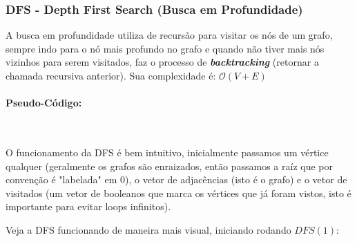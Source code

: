 \subsubsection{DFS - Depth First Search (Busca em Profundidade)}
A busca em profundidade utiliza de recursão para visitar os nós de um grafo,
sempre indo para o nó mais profundo no grafo e quando não tiver mais nós
vizinhos para serem visitados, faz o processo de \textbf{\textit{backtracking}}
(retornar a chamada recursiva anterior). Sua complexidade é: $\mathcal{O}(V+E)$

\paragraph{Pseudo-Código: }\mbox{}\\
\begin{algorithm}[H]

	\SetAlgoLined

	\caption{Busca em Profundidade (DFS)}
\end{algorithm}

O funcionamento da DFS é bem intuitivo, inicialmente passamos um vértice
qualquer (geralmente os grafos são enraizados, então passamos a raíz que por
convenção é "labelada" em 0), o vetor de adjacências (isto é o grafo) e o vetor
de visitados (um vetor de booleanos que marca os vértices que já foram vistos,
isto é importante para evitar loops infinitos).

Veja a DFS funcionando de maneira mais visual, iniciando rodando $DFS(1)$:\\

